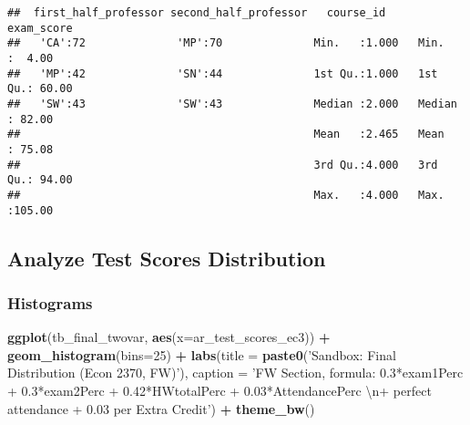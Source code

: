 \documentclass[
]{article}
\newenvironment{Shaded}{\begin{snugshade}}{\end{snugshade}}
\newcommand{\CharTok}[1]{\textcolor[rgb]{0.31,0.60,0.02}{#1}}
\newcommand{\DataTypeTok}[1]{\textcolor[rgb]{0.13,0.29,0.53}{#1}}
\newcommand{\DecValTok}[1]{\textcolor[rgb]{0.00,0.00,0.81}{#1}}
\newcommand{\KeywordTok}[1]{\textcolor[rgb]{0.13,0.29,0.53}{\textbf{#1}}}
\newcommand{\NormalTok}[1]{#1}
\newcommand{\OperatorTok}[1]{\textcolor[rgb]{0.81,0.36,0.00}{\textbf{#1}}}
\newcommand{\OtherTok}[1]{\textcolor[rgb]{0.56,0.35,0.01}{#1}}
\newcommand{\StringTok}[1]{\textcolor[rgb]{0.31,0.60,0.02}{#1}}
\begin{document}
\begin{Shaded}
\end{Shaded}

\begin{verbatim}
##  first_half_professor second_half_professor   course_id       exam_score    
##   'CA':72              'MP':70              Min.   :1.000   Min.   :  4.00  
##   'MP':42              'SN':44              1st Qu.:1.000   1st Qu.: 60.00  
##   'SW':43              'SW':43              Median :2.000   Median : 82.00  
##                                             Mean   :2.465   Mean   : 75.08  
##                                             3rd Qu.:4.000   3rd Qu.: 94.00  
##                                             Max.   :4.000   Max.   :105.00
\end{verbatim}

\hypertarget{analyze-test-scores-distribution}{%
\subsection{Analyze Test Scores
Distribution}\label{analyze-test-scores-distribution}}

\hypertarget{histograms}{%
\subsubsection{Histograms}\label{histograms}}

\begin{Shaded}
\begin{Highlighting}[]
\KeywordTok{ggplot}\NormalTok{(tb_final_twovar, }\KeywordTok{aes}\NormalTok{(}\DataTypeTok{x=}\NormalTok{ar_test_scores_ec3)) }\OperatorTok{+}
\StringTok{  }\KeywordTok{geom_histogram}\NormalTok{(}\DataTypeTok{bins=}\DecValTok{25}\NormalTok{) }\OperatorTok{+}
\StringTok{  }\KeywordTok{labs}\NormalTok{(}\DataTypeTok{title =} \KeywordTok{paste0}\NormalTok{(}\StringTok{'Sandbox: Final Distribution (Econ 2370, FW)'}\NormalTok{),}
       \DataTypeTok{caption =} \StringTok{'FW Section, formula: 0.3*exam1Perc + 0.3*exam2Perc + 0.42*HWtotalPerc + 0.03*AttendancePerc }\CharTok{\textbackslash{}n}\StringTok{+ perfect attendance + 0.03 per Extra Credit'}\NormalTok{) }\OperatorTok{+}
\StringTok{  }\KeywordTok{theme_bw}\NormalTok{()}
\end{Highlighting}
\end{Shaded}
\end{document}
